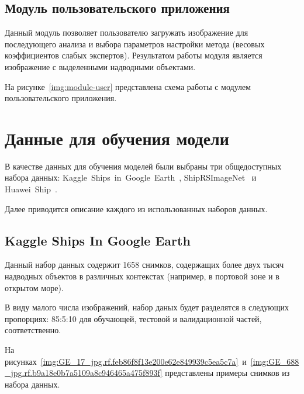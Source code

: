 

\subsection*{Модуль пользовательского приложения}

Данный модуль позволяет пользователю загружать изображение для последующего анализа и выбора параметров настройки метода (весовых коэффициентов слабых экспертов). Результатом работы модуля является изображение с выделенными надводными объектами.

На рисунке~\ref{img:module-user} представлена схема работы с модулем пользовательского приложения.


\section{Данные для обучения модели}

В качестве данных для обучения моделей были выбраны три общедоступных набора данных: Kaggle~Ships~in~Google~Earth~\cite{kaggle-ships-in-google-earth-dfqwt_dataset}, ShipRSImageNet~\cite{shiprs-imagenet} и Huawei~Ship~\cite{huawei_ship_dataset}.

Далее приводится описание каждого из использованных наборов данных.

\subsection*{Kaggle Ships In Google Earth}

Данный набор данных содержит 1658 снимков, содержащих более двух тысяч надводных объектов в различных контекстах (например, в портовой зоне и в открытом море).

В виду малого числа изображений, набор даных будет разделятся в следующих пропорциях: 85:5:10 для обучающей, тестовой и валидационной частей, соответственно.

На рисунках~\ref{img:GE_17_jpg.rf.feb86f8f13e200e62e849939c5ea5c7a}~и~\ref{img:GE_688_jpg.rf.b9a18e0b7a5109a8c946465a475f893f} представлены примеры снимков из набора данных.


